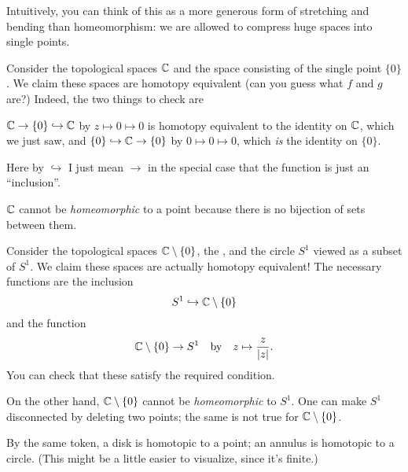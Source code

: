 Intuitively, you can think of this as a more generous form of stretching
and bending than homeomorphism: we are allowed to compress huge spaces into single points.

\begin{example}[$\CC$ is contractible]
	Consider the topological spaces $\CC$
	and the space consisting of the single point $\{0\}$.
	We claim these spaces are homotopy equivalent (can you guess what $f$ and $g$ are?)
	Indeed, the two things to check are
	\begin{enumerate}[(i)]
		\ii $\mathbb C \to \{0\} \hookrightarrow \mathbb C$ by $z \mapsto 0 \mapsto 0$
		is homotopy equivalent to the identity on $\CC$, which we just saw, and
		\ii $\{0\} \hookrightarrow \mathbb C \to \{0\}$ by $0 \mapsto 0 \mapsto 0$, which \emph{is} the identity on $\{0\}$.
	\end{enumerate}
	Here by $\hookrightarrow$ I just mean $\to$ in the special case
	that the function is just an ``inclusion''.
\end{example}
\begin{remark}
	$\CC$ cannot be \emph{homeomorphic} to a point
	because there is no bijection of sets between them.
\end{remark}

\begin{example}
	Consider the topological spaces $\mathbb C \setminus \{0\}$,
	the , and the circle $S^1$ viewed as a subset of $S^1$.
	We claim these spaces are actually homotopy equivalent!
	The necessary functions are the inclusion
	\[ S^1 \hookrightarrow \mathbb C \setminus \{0\} \]
	and the function
	\[ \mathbb C \setminus \{0\} \to S^1
		\quad\text{by}\quad
		z \mapsto \frac{z}{\left\lvert z \right\rvert}. \]
	You can check that these satisfy the required condition.
\end{example}
\begin{remark}
	On the other hand, $\mathbb C \setminus \{0\}$ cannot be \emph{homeomorphic} to $S^1$.
	One can make $S^1$ disconnected by deleting two points;
	the same is not true for $\mathbb C \setminus \{0\}$.
\end{remark}
\begin{example}
	[$\text{Disk} = \text{Point}$, $\text{Annulus} = \text{Circle}$.]
	By the same token, a disk is homotopic to a point;
	an annulus is homotopic to a circle.
	(This might be a little easier to visualize, since it's finite.)
\end{example}

